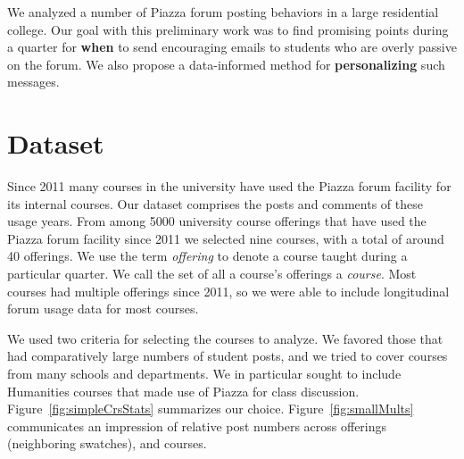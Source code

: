 We analyzed a number of Piazza \cite{piazza} forum posting behaviors
in a large residential college. Our goal with this preliminary work
was to find promising points during a quarter for {\bf when} to send
encouraging emails to students who are overly passive on the forum. We
also propose a data-informed method for {\bf personalizing} such
messages.

\section{Dataset}

Since 2011 many courses in the university have used the Piazza forum
facility for its internal courses. Our dataset comprises the posts and
comments of these usage years. From among 5000 university course
offerings that have used the Piazza forum facility since 2011 we
selected nine courses, with a total of around 40 offerings. We use the
term {\em offering} to denote a course taught during a particular
quarter. We call the set of all a course's offerings a {\em course}.
Most courses had multiple offerings since 2011, so we were able to
include longitudinal forum usage data for most courses.

We used two criteria for selecting the courses to analyze. We favored
those that had comparatively large numbers of student posts, and we
tried to cover courses from many schools and departments. We in
particular sought to include Humanities courses that made use of
Piazza for class discussion. Figure~\ref{fig:simpleCrsStats}
summarizes our choice. Figure~\ref{fig:smallMults} communicates an
impression of relative post numbers across offerings (neighboring
swatches), and courses.
 
